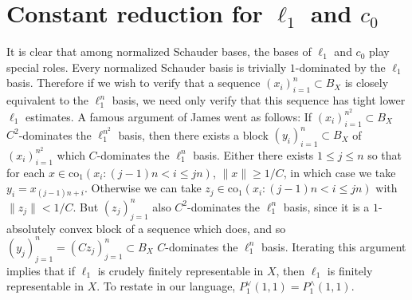 \documentclass[12pt]{amsart}
\theoremstyle{definition}
\begin{document}
\section{Constant reduction for $\ell_1$ and $c_0$}



It is clear that among normalized Schauder bases, the bases of $\ell_1$ and $c_0$ play special roles.  Every normalized Schauder basis is trivially $1$-dominated by the $\ell_1$ basis.  Therefore if we wish to verify that a sequence $(x_i)_{i=1}^n\subset B_X$ is closely equivalent to the $\ell_1^n$ basis, we need only verify that this sequence has tight lower $\ell_1$ estimates.  A famous argument of James \cite{James} went as follows: If $(x_i)_{i=1}^{n^2}\subset B_X$ $C^2$-dominates the $\ell_1^{n^2}$ basis, then there exists a block $(y_i)_{i=1}^n\subset B_X$ of $(x_i)_{i=1}^{n^2}$ which $C$-dominates the $\ell_1^n$ basis.  Either there exists $1\leqslant j\leqslant n$ so that for each $x\in \text{co}_1(x_i: (j-1)n<i\leqslant jn)$, $\|x\|\geqslant 1/C$, in which case we take $y_i=x_{(j-1)n+i}$.  Otherwise we can take $z_j\in \text{co}_1(x_i: (j-1)n<i\leqslant jn)$ with $\|z_j\|<1/C$.  But $(z_j)_{j=1}^n$ also $C^2$-dominates the $\ell_1^n$ basis, since it is a $1$-absolutely convex block of a sequence which does, and so $(y_j)_{j=1}^n=(Cz_j)_{j=1}^n\subset B_X$ $C$-dominates the $\ell_1^n$ basis.  Iterating this argument implies that if $\ell_1$ is crudely finitely representable in $X$, then $\ell_1$ is finitely representable in $X$.  To restate in our language, $P_1^\vee(1,1)=P_1^\wedge(1,1)$.  
\end{document}
